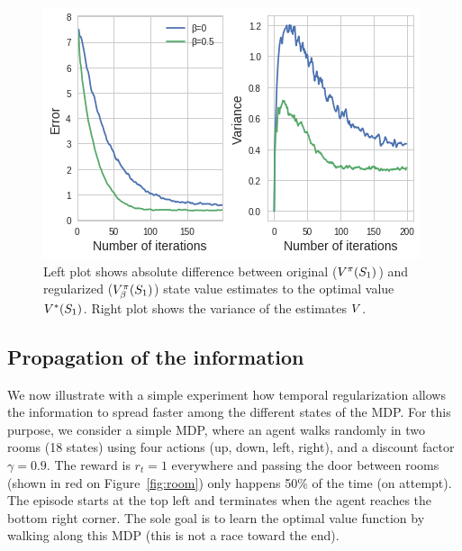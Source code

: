 \begin{figure}
	\centering

	\includegraphics[scale=0.7]{./fig/Exp_2_result.png}
\caption{Left plot shows absolute difference between original ($V^{\pi}(S_1)$) and regularized ($V_{\beta}^{\pi}(S_1)$) state value estimates to the optimal value $V^*(S_1)$. Right plot shows the variance of the estimates $V$.}
\label{fig:perf_MDP}
\end{figure}


\subsection{Propagation of the information}
We now illustrate with a simple experiment how temporal regularization allows the information to spread faster among the different states of the MDP. For this purpose, we consider a simple MDP, where an agent walks randomly in two rooms (18 states) using four actions (up, down, left, right), and a discount factor $\gamma=0.9$. The reward is $r_t=1$ everywhere and passing the door between rooms (shown in red on Figure~\ref{fig:room}) only happens 50\% of the time (on attempt). The episode starts at the top left and terminates when the agent reaches the bottom right corner. The sole goal is to learn the optimal value function by walking along this MDP (this is not a race toward the end).

